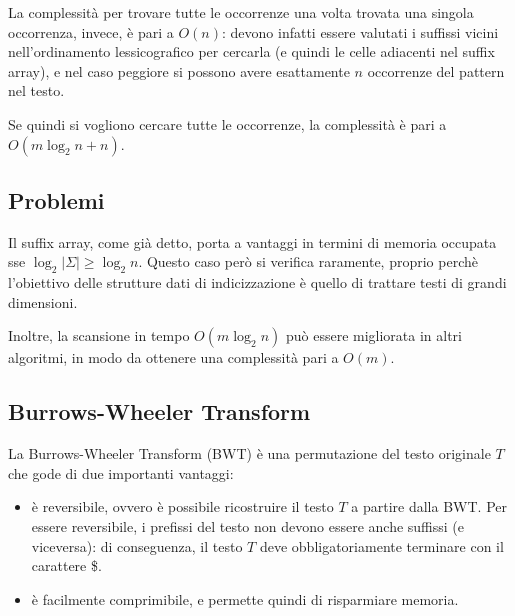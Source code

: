 La complessità per trovare tutte le occorrenze una volta trovata una singola occorrenza, invece, è pari a $O(n)$: devono infatti essere valutati i suffissi vicini nell'ordinamento lessicografico per cercarla (e quindi le celle adiacenti nel suffix array), e nel caso peggiore si possono avere esattamente $n$ occorrenze del pattern nel testo.

Se quindi si vogliono cercare tutte le occorrenze, la complessità è pari a $O(m \log_2 n + n)$.

\subsection{Problemi}
Il suffix array, come già detto, porta a vantaggi in termini di memoria occupata sse $\log_2 |\Sigma| \ge \log_2 n$. Questo caso però si verifica raramente, proprio perchè l'obiettivo delle strutture dati di indicizzazione è quello di trattare testi di grandi dimensioni.

Inoltre, la scansione in tempo $O(m \log_2 n)$ può essere migliorata in altri algoritmi, in modo da ottenere una complessità pari a $O(m)$.

\subsection*{Burrows-Wheeler Transform}
\begin{defn}
    La Burrows-Wheeler Transform (BWT) è una permutazione del testo originale $T$ che gode di due importanti vantaggi:
    \begin{itemize}
        \item è reversibile, ovvero è possibile ricostruire il testo $T$ a partire dalla BWT. Per essere reversibile, i prefissi del testo non devono essere anche suffissi (e viceversa): di conseguenza, il testo $T$ deve obbligatoriamente terminare con il carattere \$.
        \item è facilmente comprimibile, e permette quindi di risparmiare memoria.
    \end{itemize}
\end{defn}

